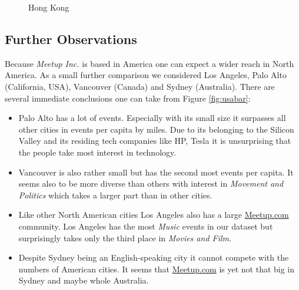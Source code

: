 \begin{figure}[!htp]
	\hfill
	\caption{Hong Kong}\label{fig:hongkongmap}
\end{figure}

\subsection*{Further Observations}

Because \emph{Meetup Inc.} is based in America one can expect a wider reach in North America. As a small further comparison we considered Los Angeles, Palo Alto (California, USA), Vancouver (Canada) and Sydney (Australia). There are several immediate conclusions one can take from Figure \ref{fig:usabar}:
\begin{itemize}
	\item Palo Alto has a lot of events. Especially with its small size it surpasses all other cities in events per capita by miles. Due to its belonging to the Silicon Valley and its residing tech companies like HP, Tesla it is unsurprising that the people take most interest in technology. 
	\item Vancouver is also rather small but has the second most events per capita. It seems also to be more diverse than others with interest in \emph{Movement and Politics} which takes a larger part than in other cities. 
	\item Like other North American cities Los Angeles also has a large \url{Meetup.com} community. Los Angeles has the most \emph{Music} events in our dataset but surprisingly takes only the third place in \emph{Movies and Film}.
	\item Despite Sydney being an English-speaking city it cannot compete with the numbers of American cities. It seems that \url{Meetup.com} is yet not that big in Sydney and maybe whole Australia. 
\end{itemize}

